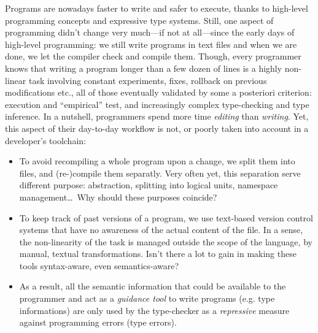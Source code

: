 \documentclass[preprint]{sigplanconf}
\begin{document}
Programs are nowadays faster to write and safer to execute, thanks to
high-level programming concepts and expressive type systems. Still,
one aspect of programming didn't change very much---if not at
all---since the early days of high-level programming: we still write
programs in text files and when we are done, we let the compiler check
and compile them.  Though, every programmer knows that writing a
program longer than a few dozen of lines is a highly non-linear task
involving constant experiments, fixes, rollback on previous
modifications etc., all of those eventually validated by some a
posteriori criterion: execution and ``empirical'' test, and
increasingly complex type-checking and type inference. In a nutshell,
programmers spend more time \emph{editing} than \emph{writing}. Yet,
this aspect of their day-to-day workflow is not, or poorly taken into
account in a developer's toolchain:
\begin{itemize}
\item To avoid recompiling a whole program upon a change, we split
  them into files, and (re-)compile them separatly. Very often yet,
  this separation serve different purpose: abstraction, splitting into
  logical units, namespace management\ldots\ Why should these purposes
  coincide?

\item To keep track of past versions of a program, we use text-based
  version control systems that have no awareness of the actual content
  of the file. In a sense, the non-linearity of the task is managed
  outside the scope of the language, by manual, textual
  transformations. Isn't there a lot to gain in making these tools
  syntax-aware, even semantics-aware?

\item As a result, all the semantic information that could be
  available to the programmer and act as a \emph{guidance tool} to
  write programs (e.g. type informations) are only used by the
  type-checker as a \emph{repressive} measure against programming
  errors (type errors).
\end{itemize}
\end{document}
